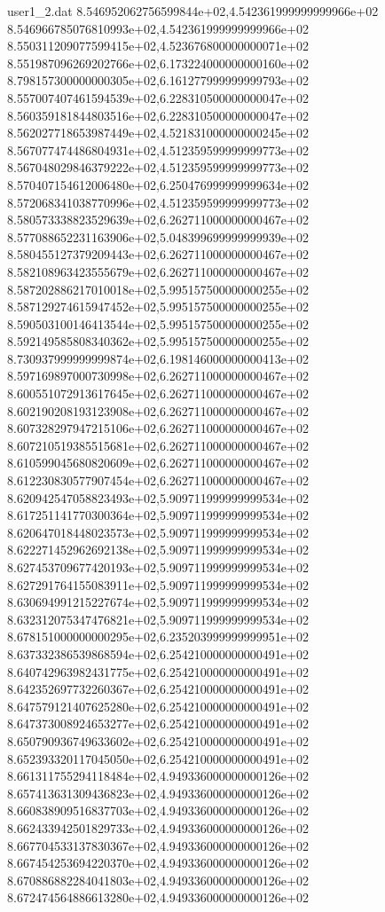 \begin{filecontents}{user1_2.dat}
8.546952062756599844e+02,4.542361999999999966e+02
8.546966785076810993e+02,4.542361999999999966e+02
8.550311209077599415e+02,4.523676800000000071e+02
8.551987096269202766e+02,6.173224000000000160e+02
8.798157300000000305e+02,6.161277999999999793e+02
8.557007407461594539e+02,6.228310500000000047e+02
8.560359181844803516e+02,6.228310500000000047e+02
8.562027718653987449e+02,4.521831000000000245e+02
8.567077474486804931e+02,4.512359599999999773e+02
8.567048029846379222e+02,4.512359599999999773e+02
8.570407154612006480e+02,6.250476999999999634e+02
8.572068341038770996e+02,4.512359599999999773e+02
8.580573338823529639e+02,6.262711000000000467e+02
8.577088652231163906e+02,5.048399699999999939e+02
8.580455127379209443e+02,6.262711000000000467e+02
8.582108963423555679e+02,6.262711000000000467e+02
8.587202886217010018e+02,5.995157500000000255e+02
8.587129274615947452e+02,5.995157500000000255e+02
8.590503100146413544e+02,5.995157500000000255e+02
8.592149585808340362e+02,5.995157500000000255e+02
8.730937999999999874e+02,6.198146000000000413e+02
8.597169897000730998e+02,6.262711000000000467e+02
8.600551072913617645e+02,6.262711000000000467e+02
8.602190208193123908e+02,6.262711000000000467e+02
8.607328297947215106e+02,6.262711000000000467e+02
8.607210519385515681e+02,6.262711000000000467e+02
8.610599045680820609e+02,6.262711000000000467e+02
8.612230830577907454e+02,6.262711000000000467e+02
8.620942547058823493e+02,5.909711999999999534e+02
8.617251141770300364e+02,5.909711999999999534e+02
8.620647018448023573e+02,5.909711999999999534e+02
8.622271452962692138e+02,5.909711999999999534e+02
8.627453709677420193e+02,5.909711999999999534e+02
8.627291764155083911e+02,5.909711999999999534e+02
8.630694991215227674e+02,5.909711999999999534e+02
8.632312075347476821e+02,5.909711999999999534e+02
8.678151000000000295e+02,6.235203999999999951e+02
8.637332386539868594e+02,6.254210000000000491e+02
8.640742963982431775e+02,6.254210000000000491e+02
8.642352697732260367e+02,6.254210000000000491e+02
8.647579121407625280e+02,6.254210000000000491e+02
8.647373008924653277e+02,6.254210000000000491e+02
8.650790936749633602e+02,6.254210000000000491e+02
8.652393320117045050e+02,6.254210000000000491e+02
8.661311755294118484e+02,4.949336000000000126e+02
8.657413631309436823e+02,4.949336000000000126e+02
8.660838909516837703e+02,4.949336000000000126e+02
8.662433942501829733e+02,4.949336000000000126e+02
8.667704533137830367e+02,4.949336000000000126e+02
8.667454253694220370e+02,4.949336000000000126e+02
8.670886882284041803e+02,4.949336000000000126e+02
8.672474564886613280e+02,4.949336000000000126e+02

\end{filecontents}
